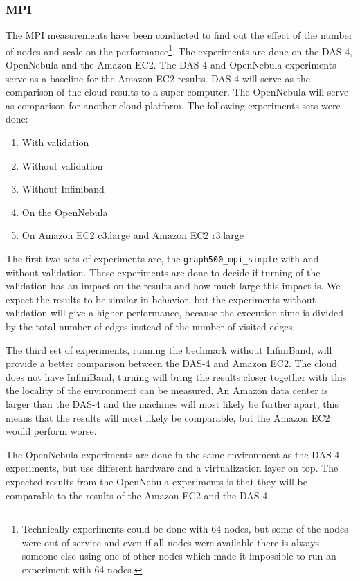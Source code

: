 \subsubsection{MPI}
The MPI measurements have been conducted to find out the effect of the number of nodes and scale on the performance\footnote{Technically experiments could be done with 64 nodes, but some of the nodes were out of service and even if all nodes were available there is always someone else using one of other nodes which made it impossible to run an experiment with 64 nodes.}.
The experiments are done on the DAS-4, OpenNebula and the Amazon EC2. The DAS-4 and OpenNebula experiments serve as a baseline for the Amazon EC2 results. DAS-4 will serve as the comparison of the cloud results to a super computer. The OpenNebula will serve as comparison for another cloud platform. The following experiments sets were done:
\begin{enumerate}
	\item With validation
	\item Without validation
	\item Without Infiniband
	\item On the OpenNebula
	\item On Amazon EC2 c3.large and Amazon EC2 r3.large 
\end{enumerate}

The first two sets of experiments are, the \texttt{graph500\_mpi\_simple} with and without validation. These experiments are done to decide if turning of the validation has an impact on the results and how much large this impact is. We expect the results to be similar in behavior, but the experiments without validation will give a higher performance, because the execution time is divided by the total number of edges instead of the number of visited edges.

The third set of experiments, running the bechmark without InfiniBand, will provide a better comparison between the DAS-4 and Amazon EC2. The cloud does not have InfiniBand, turning will bring the results closer together with this the locality of the environment can be measured. An Amazon data center is larger than the DAS-4 and the machines will most likely be further apart, this means that the results will most likely be comparable, but the Amazon EC2 would perform worse.

The OpenNebula experiments are done in the same environment as the DAS-4 experiments, but use different hardware and a virtualization layer on top. The expected results from the OpenNebula experiments is that they will be comparable to the results of the Amazon EC2 and the DAS-4.

